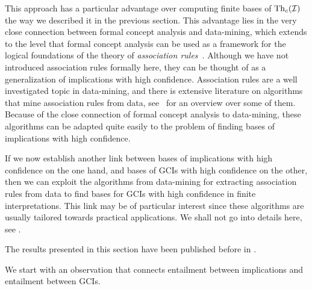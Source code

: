 This approach has a particular advantage over computing finite bases of
$\operatorname{Th}_c(\mathcal{I})$ the way we described it in the previous section.  This advantage lies
in the very close connection between formal concept analysis and data-mining, which
extends to the level that formal concept analysis can be used as a framework for the
logical foundations of the theory of \emph{association rules}~\cite{arules:Zaki:1998}.
Although we have not introduced association rules formally here, they can be thought of as
a generalization of implications with high confidence.  Association rules are a well
investigated topic in data-mining, and there is extensive literature on algorithms that
mine association rules from data, see~\cite{arules:Hipp:2000} for an overview over some of
them.  Because of the close connection of formal concept analysis to data-mining, these
algorithms can be adapted quite easily to the problem of finding bases of implications
with high confidence.

If we now establish another link between bases of implications with high confidence on the
one hand, and bases of GCIs with high confidence on the other, then we can exploit the
algorithms from data-mining for extracting association rules from data to find bases for
GCIs with high confidence in finite interpretations.  This link may be of particular
interest since these algorithms are usually tailored towards practical applications.  We
shall not go into details here, see .

The results presented in this section have been published before in
\cite{Borchmann-LTCS-12-06}.

We start with an observation that connects entailment between implications and entailment
between GCIs.

